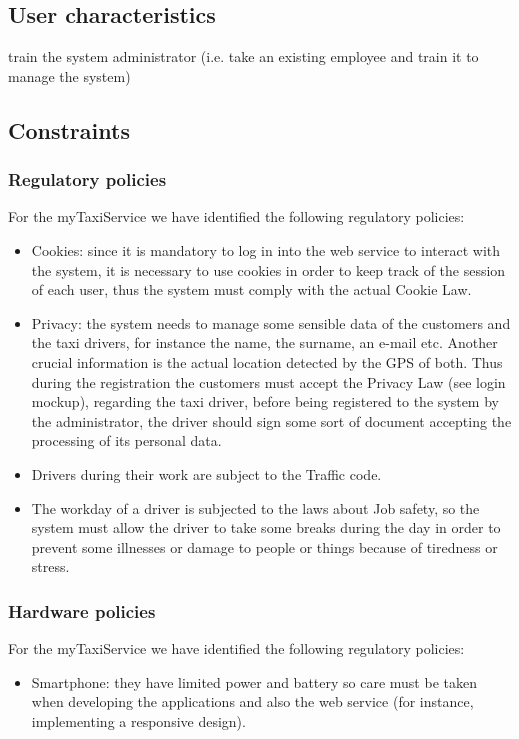 \documentclass[a4paper,12pt]{article}%
\begin{document}
\subsection{User characteristics}
train the system administrator (i.e. take an existing employee and train it to manage the system)
\subsection{Constraints}
\subsubsection{Regulatory policies}
For the myTaxiService we have identified the following regulatory policies:
\begin{itemize}
\item Cookies: since it is mandatory to log in into the web service to interact with the system, it is necessary to use cookies in order to keep track of the session of each user, thus the system must comply with the actual Cookie Law.
\item Privacy: the system needs to manage some sensible data of the customers and the taxi drivers, for instance the name, the surname, an e-mail etc. Another crucial information is the actual location detected by the GPS of both. Thus during the registration the customers must accept the Privacy Law (see login mockup), regarding the taxi driver, before being registered to the system by the administrator, the driver should sign some sort of document accepting the processing of its personal data.
\item Drivers during their work are subject to the Traffic code.
\item The workday of a driver is subjected to the laws about Job safety, so the system must allow the driver to take some breaks during the day in order to prevent some illnesses or damage to people or things because of tiredness or stress.
\end{itemize}
\subsubsection{Hardware policies}
For the myTaxiService we have identified the following regulatory policies:
\begin{itemize}
\item Smartphone: they have limited power and battery so care must be taken when developing the applications and also the web service (for instance, implementing a responsive design).
\end{itemize}
\end{document}
